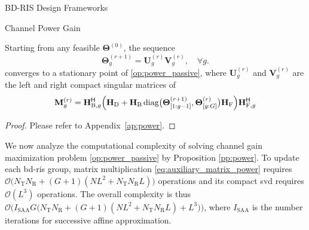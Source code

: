 \begin{section}{BD-RIS Design Frameworks}
\begin{subsection}{Channel Power Gain}
\begin{proposition}\label{pp:power}
	Starting from any feasible $\mathbf{\Theta}^{(0)}$, the sequence
	\begin{equation}
		\mathbf{\Theta}_g^{(r+1)} = \mathbf{U}_g^{(r)} \mathbf{V}_g^{(r)}, \quad \forall g.
		\label{eq:scattering_power}
	\end{equation}
	converges to a stationary point of \eqref{op:power_passive}, where $\mathbf{U}_g^{(r)}$ and $\mathbf{V}_g^{(r)}$ are the left and right compact singular matrices of
	\begin{equation}
		\mathbf{M}_g^{(r)} = \mathbf{H}_{\mathrm{B},g}^\mathsf{H} \Bigl(\mathbf{H}_\mathrm{D} + \mathbf{H}_\mathrm{B} \operatorname{diag}\bigl(\mathbf{\Theta}_{[1:g-1]}^{(r+1)},\mathbf{\Theta}_{[g:G]}^{(r)}\bigr) \mathbf{H}_\mathrm{F}\Bigr) \mathbf{H}_{\mathrm{F},g}^\mathsf{H}
		\label{eq:auxiliary_matrix_power}
	\end{equation}
\end{proposition}

\begin{proof}
	Please refer to Appendix~\ref{ap:power}.
\end{proof}

We now analyze the computational complexity of solving channel gain maximization problem \eqref{op:power_passive} by Proposition \ref{pp:power}.
To update each \gls{bd}-\gls{ris} group, matrix multiplication \eqref{eq:auxiliary_matrix_power} requires $\mathcal{O}\bigl(N_\mathrm{T} N_\mathrm{R} + (G+1)(NL^2+N_\mathrm{T} N_\mathrm{R} L)\bigr)$ operations and its compact \gls{svd} requires $\mathcal{O}(L^3)$ operations.
The overall complexity is thus $\mathcal{O}\bigl(I_\text{SAA} G \bigl(N_\mathrm{T} N_\mathrm{R} + (G+1)(NL^2+N_\mathrm{T} N_\mathrm{R} L) + L^3\bigr)\bigr)$, where $I_\text{SAA}$ is the number iterations for successive affine approximation.
\end{subsection}


\end{section}
